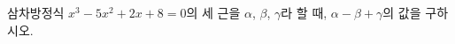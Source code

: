 삼차방정식 $x^3-5x^2+2x+8=0$의 세 근을 $\alpha$, $\beta$, $\gamma$라 할 때, $\alpha-\beta+\gamma$의 값을 구하시오. \cond{$\alpha<\beta<\gamma$}

